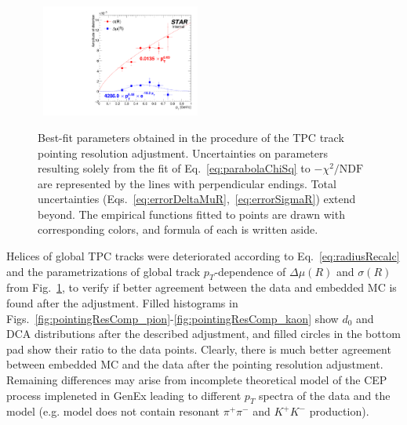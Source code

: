 
  
\begin{figure}\vspace*{-15pt}
  \centering
  ~\includegraphics[width=0.465\textwidth]{graphics/tpcHelixAdj/DistortionVsPt.pdf}\vspace*{-5pt}
  \caption[Best-fit parameters obtained in the procedure of the TPC track pointing resolution adjustment.]
   {Best-fit parameters obtained in the procedure of the TPC track pointing resolution adjustment. Uncertainties on parameters resulting solely from the fit of Eq.~\eqref{eq:parabolaChiSq} to $-\chi^{2}/\text{NDF}$ are represented by the lines with perpendicular endings. Total uncertainties (Eqs.~\eqref{eq:errorDeltaMuR},~\eqref{eq:errorSigmaR}) extend beyond. The empirical functions fitted to points are drawn with corresponding colors, and formula of each is written aside.}
   \label{fig:distortionVsPt}%
\end{figure}
Helices of global TPC tracks were deteriorated according to Eq.~\eqref{eq:radiusRecalc} and the parametrizations of global track $p_{T}$-dependence of $\Delta\mu(R)$ and $\sigma(R)$ from Fig.~\ref{fig:distortionVsPt}, to verify if better agreement between the data and embedded MC is found after the adjustment. Filled histograms in Figs.~\ref{fig:pointingResComp_pion}-\ref{fig:pointingResComp_kaon} show $d_{0}$ and DCA distributions after the described adjustment, and filled circles in the bottom pad show their ratio to the data points. Clearly, there is much better agreement between embedded MC and the data after the pointing resolution adjustment. Remaining differences may arise from incomplete theoretical model of the CEP process impleneted in GenEx leading to different $p_{T}$ spectra of the data and the model (e.g. model does not contain resonant $\pi^{+}\pi^{-}$ and $K^{+}K^{-}$ production).






